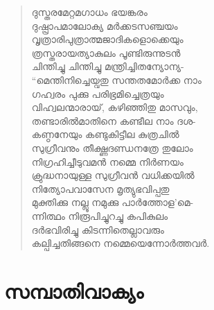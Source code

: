 \begin{verse}
ദുസ്തരമേറ്റമഗാധം ഭയങ്കരം\\
ദുഷ്പ്രാപമാലോക്യ മര്‍ക്കടസഞ്ചയം\\
വൃത്രാരിപുത്രാത്മജാദികളൊക്കെയും\\
ത്രസ്തരായത്യാകുലം പൂണ്ടിരുന്നുടന്‍\\
ചിന്തിച്ചു ചിന്തിച്ചു മന്ത്രിച്ചിതന്യോന്യ-\\
“മെന്തിനിച്ചെയ്വതു സന്തതമോര്‍ക്ക നാം\\
ഗഹ്വരം പുക്കു പരിഭ്രമിച്ചെത്രയും\\
വിഹ്വലന്മാരായ്, കഴിഞ്ഞിതു മാസവും,\\
തണ്ടാരില്‍മാതിനെ കണ്ടീല നാം ദശ-\\
കണ്ഠനേയും കണ്ടുകിട്ടീല കുത്രചില്‍\\
സുഗ്രീവനും തീക്ഷ്ണദണ്ഡനത്രേ തുലോം\\
നിഗ്രഹിച്ചീടുവമന്‍ നമ്മെ നിര്‍ണയം\\
ക്രുദ്ധനായുള്ള സുഗ്രീവന്‍ വധിക്കയില്‍\\
നിത്യോപവാസേന മൃത്യുഭവിപ്പതു\\
മുക്തിക്കു നല്ലൂ നമുക്കു പാര്‍ത്തോള’മെ-\\
ന്നിത്ഥം നിരൂപിച്ചുറച്ചു കപികുലം\\
ദര്‍ഭവിരിച്ചു കിടന്നിതെല്ലാവരും\\
കല്പിച്ചതിങ്ങനെ നമ്മെയെന്നോര്‍ത്തവര്‍.
\end{verse}


\section{സമ്പാതിവാക്യം}

